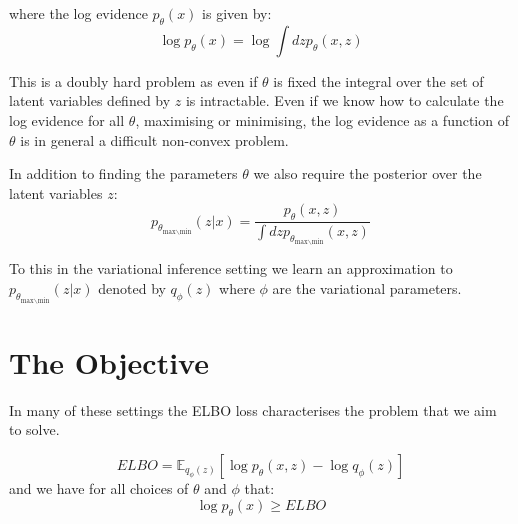 \documentclass{article}
\begin{document}
where the log evidence $p_\theta(x)$ is given by:
\begin{equation}
  \log p_{\theta}(x) = \log \int dz p_\theta(x,z)
\end{equation}

This is a doubly hard problem as even if $\theta$ is fixed the integral over the set
of latent variables defined by $z$ is intractable. 
Even if we know how to calculate the log evidence for all $\theta$, maximising or minimising, 
the log evidence as a function of $\theta$ is in general a difficult non-convex problem. 

In addition to finding the parameters $\theta$ we also require the posterior over
the latent variables $z$:
\begin{equation}
  p_{\theta_{\text{max$\backslash$min}}}(z|x) =  \frac{p_{\theta}(x,z)}{\int dz p_{\theta_{\text{max$\backslash$min}}}(x,z)} 
\end{equation}

To this in the variational inference setting we learn an approximation to $p_{\theta_{\text{max$\backslash$min}}}(z|x)$
denoted by $q_\phi(z)$ where $\phi$ are the variational parameters. 

\section{The Objective}

In many of these settings the ELBO loss characterises the problem that we 
aim to solve. 

\begin{equation}
  ELBO = \mathbb{E}_{q_{\phi}(z)} [ \log p_{\theta}(x,z) - \log q_{\phi}(z) ]
\end{equation}
and we have for all choices of $\theta$ and $\phi$ that:
\begin{equation}
  \log p_{\theta}(x) \geq ELBO 
\end{equation}
\end{document}
